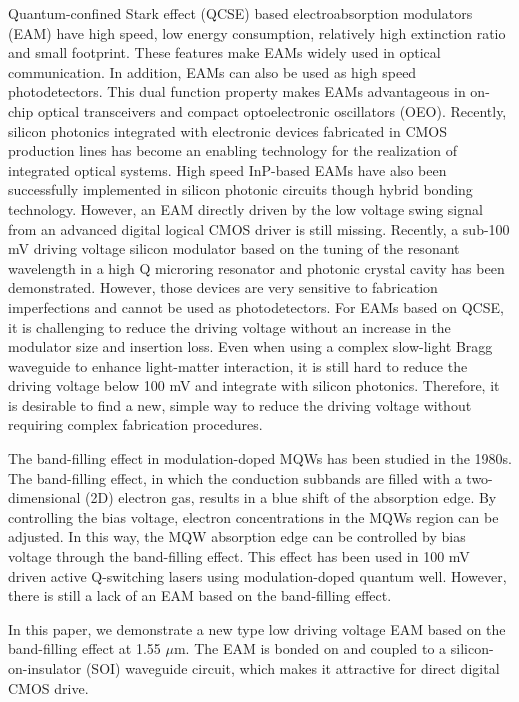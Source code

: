\documentclass[aip,apl,reprint,a4paper]{revtex4-1}
\begin{document}
Quantum-confined Stark effect (QCSE) based electroabsorption modulators (EAM) have high speed, low energy consumption, relatively high extinction ratio and small footprint.\cite{Yong40,Fukano} These features make EAMs widely used in optical communication. In addition, EAMs can also be used as high speed photodetectors.\cite{Welstand} This dual function property makes EAMs advantageous in on-chip optical transceivers \cite{Transceiver} and compact optoelectronic oscillators (OEO).\cite{Zhou} Recently, silicon photonics integrated with electronic devices fabricated in CMOS production lines has become an enabling technology for the realization of integrated optical systems.\cite{Marpaung,Sun} High speed InP-based EAMs have also been successfully implemented in silicon photonic circuits though hybrid bonding technology.\cite{Yong40,Transceiver,roelkensiii-v-on-silicon2015,fu52015} However, an EAM directly driven by the low voltage swing signal from an advanced digital logical CMOS driver is still missing. Recently, a sub-100 mV driving voltage silicon modulator based on the tuning of the resonant wavelength in a high Q microring resonator and photonic crystal cavity has been demonstrated.\cite{Manipatruni,Shakoor:14} However, those devices are very sensitive to fabrication imperfections and cannot be used as photodetectors. For EAMs based on QCSE, it is challenging to reduce the driving voltage without an increase in the modulator size and insertion loss. Even when using a complex slow-light Bragg waveguide to enhance light-matter interaction, it is still hard to reduce the driving voltage below 100 mV and integrate with silicon photonics.\cite{gulow-voltage2013} Therefore, it is desirable to find a new, simple way to reduce the driving voltage without requiring complex fabrication procedures.


The band-filling effect in modulation-doped MQWs has been studied in the 1980s.\cite{livescu1988free} The band-filling effect, in which the conduction subbands are filled with a two-dimensional (2D) electron gas, results in a blue shift of the absorption edge. By controlling the bias voltage, electron concentrations in the MQWs region can be adjusted. In this way, the MQW absorption edge can be controlled by bias voltage through the band-filling effect. This effect has been used in 100 mV driven active Q-switching lasers using modulation-doped quantum well.\cite{kalinovsky1993free} However, there is still a lack of an EAM based on the band-filling effect.


In this paper, we demonstrate a new type low driving voltage EAM based on the band-filling effect at 1.55 $\mu$m. The EAM is bonded on and coupled to a silicon-on-insulator (SOI) waveguide circuit, which makes it attractive for direct digital CMOS drive.
\end{document}
